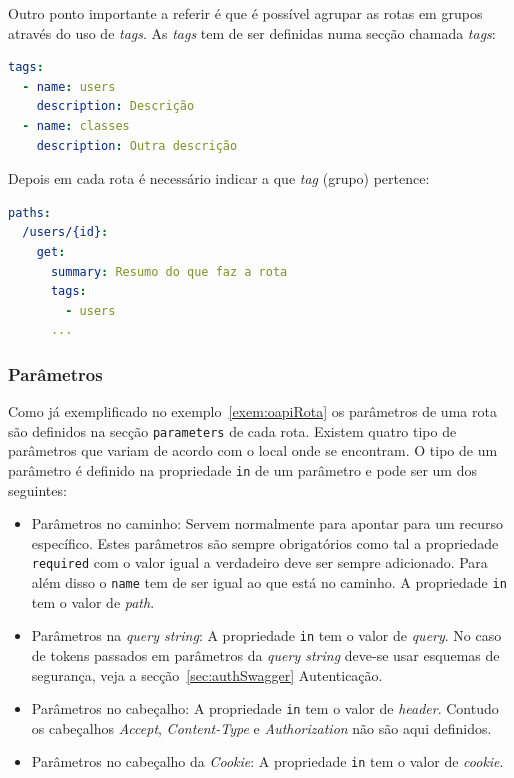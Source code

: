Outro ponto importante a referir é que é possível agrupar as rotas em grupos através do uso de \textit{tags}. As \textit{tags} tem de ser definidas numa secção chamada \textit{tags}:
\begin{lstlisting}[language=yaml, caption={Exemplo de secção \texttt{tags} defininfo tags na especificação \textit{OpenAPI}}]
tags:
  - name: users
    description: Descrição
  - name: classes
    description: Outra descrição
\end{lstlisting}

Depois em cada rota é necessário indicar a que \textit{tag} (grupo) pertence:
\begin{lstlisting}[language=yaml, caption=Exemplo de uso de \textit{tags} numa rota na especificação \textit{OpenAPI}]
paths:
  /users/{id}:
    get:
      summary: Resumo do que faz a rota
      tags:
        - users
      ...
\end{lstlisting}

\vspace{-0.7cm}

\subsubsection{Parâmetros}\label{sec:paramSwagger}
Como já exemplificado no exemplo~\ref{exem:oapiRota} os parâmetros de uma rota são definidos na secção \texttt{parameters} de cada rota. Existem quatro tipo de parâmetros que variam de acordo com o local onde se encontram. O tipo de um parâmetro é definido na propriedade \texttt{in} de um parâmetro e pode ser um dos seguintes:
\begin{itemize}
    \item Parâmetros no caminho: Servem normalmente para apontar para um recurso específico. Estes parâmetros são sempre obrigatórios como tal a propriedade \texttt{required} com o valor igual a verdadeiro deve ser sempre adicionado. Para além disso o \texttt{name} tem de ser igual ao que está no caminho. A propriedade \texttt{in} tem o valor de \textit{path}.
    \item Parâmetros na \textit{query string}: A propriedade \texttt{in} tem o valor de \textit{query}. No caso de tokens passados em parâmetros da \textit{query string} deve-se usar esquemas de segurança, veja a secção~\ref{sec:authSwagger} Autenticação.
    \item Parâmetros no cabeçalho: A propriedade \texttt{in} tem o valor de \textit{header}. Contudo os cabeçalhos \textit{Accept}, \textit{Content-Type} e \textit{Authorization} não são aqui definidos.
    \item Parâmetros no cabeçalho da \textit{Cookie}: A propriedade \texttt{in} tem o valor de \textit{cookie}.
\end{itemize}


